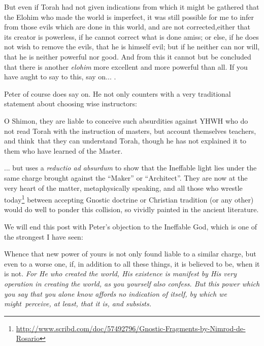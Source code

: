 \begin{quotex}
But even if Torah had not given indications from which it might be gathered that the Elohim who made the world is imperfect, it was still possible for me to infer from those evils which are done in this world, and are not corrected,either that its creator is powerless, if he cannot correct what is done amiss; or else, if he does not wish to remove the evils, that he is himself evil; but if he neither can nor will, that he is neither powerful nor good. And from this it cannot but be concluded that there is another \emph{elohim} more excellent and more powerful than all. If you have aught to say to this, say on... .
\end{quotex}


Peter of course does say on. He not only counters with a very traditional statement about choosing wise instructors:

\begin{quotex}
O Shimon, they are liable to conceive such absurdities against YHWH who do not read Torah with the instruction of masters, but account themselves teachers, and think~that they can understand Torah, though he has not explained it to them who have learned of the Master.
\end{quotex}


... but uses a \emph{reductio ad absurdum} to show that the Ineffable light lies under the same charge brought against the ``Maker'' or ``Architect''. They are now at the very heart of the matter, metaphysically speaking, and all those who wrestle today\footnote{\url{http://www.scribd.com/doc/57492796/Gnostic-Fragments-by-Nimrod-de-Rosario}} between accepting Gnostic doctrine or Christian tradition (or any other) would do well to ponder this collision, so vividly painted in the ancient literature.

We will end this post with Peter's objection to the Ineffable God, which is one of the strongest I have seen:

\begin{quotex}
Whence that new power of yours is not only found liable to a similar charge, but even to a worse one, if, in addition to all these things, it is believed to be, when it is not. \emph{For He who created the world, His existence is manifest by His very operation in creating the world, as you yourself also confess. But this power which you say that you alone know affords no indication of itself, by which we might~perceive, at least, that it is, and subsists.}
\end{quotex}


